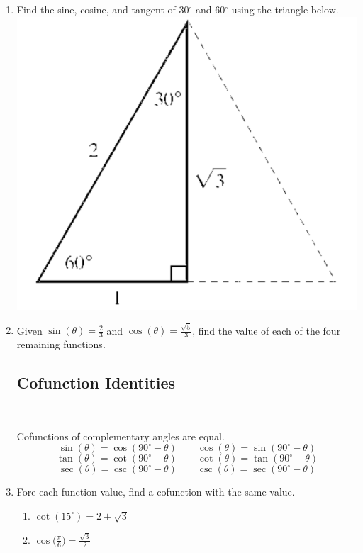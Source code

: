 \begin{enumerate}
\item Find the sine, cosine, and tangent of 30$^{\circ}$ and  60$^{\circ}$ using the triangle below.\\
\includegraphics[scale=.6]{trigex3}\\


\newpage

\item Given $\sin(\theta)=\frac{2}{3}$ and $\cos(\theta)=\frac{\sqrt{5}}{3}$, find the value of each of the four remaining functions.\vfill
\vfill


\subsection{Cofunction Identities} ~

\noindent Cofunctions of complementary angles are equal.
$$\sin(\theta)=\cos(90^{\circ}-\theta) \quad \quad \cos(\theta)=\sin(90^{\circ}-\theta)$$
$$\tan(\theta)=\cot(90^{\circ}-\theta) \quad \quad \cot(\theta)=\tan(90^{\circ}-\theta)$$
$$\sec(\theta)=\csc(90^{\circ}-\theta) \quad \quad \csc(\theta)=\sec(90^{\circ}-\theta)$$



\item Fore each function value, find a cofunction with the same value.
\begin{enumerate}
\item $\cot(15^{\circ})=2+\sqrt{3}$\vfill
\item $\displaystyle \cos\Bigg(\frac{\pi}{6}\Bigg)=\frac{\sqrt{3}}{2}$\vfill
\end{enumerate}


\end{enumerate}

